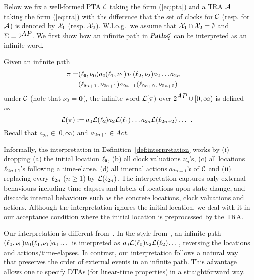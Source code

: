 Below we fix a well-formed PTA $\mathcal{C}$ taking the form (\ref{eq:pta}) and a TRA $\mathcal{A}$ taking the form (\ref{eq:tra}) with the difference that the set of clocks for $\mathcal{C}$ (resp. for $\mathcal{A}$) is denoted by $\mathcal{X}_1$ (resp. $\mathcal{X}_2$).
W.l.o.g., we assume that $\mathcal{X}_1\cap\mathcal{X}_2=\emptyset$ and $\Sigma=2^{\mbox{\sl AP}}$.
We first show how an infinite path in $\mbox{\sl Paths}^\omega_{\mathcal{C}}$ can be interpreted as an infinite word.
% 
\begin{definition}\label{def:interpretation}
Given an infinite path
\begin{align*}
    \pi
        =
        & 
            (\ell_0,\nu_0)
            a_0
            (\ell_1,\nu_1)
            a_1
            (\ell_2,\nu_2)a_2
            \dots 
            a_{2n} \\
        &
            (\ell_{2n+1},\nu_{2n+1})
            a_{2n+1}
            (\ell_{2n+2},\nu_{2n+2})
            \dots
\end{align*}
under $\mathcal{C}$ (note that $\nu_0=\mathbf{0}$), the infinite word $\mathcal{L}(\pi)$ over $2^{\mbox{\sl AP}}\cup[0,\infty)$ is defined as 
\[
\mathcal{L}(\pi):=a_0\mathcal{L}(\ell_2)a_2\mathcal{L}(\ell_4)\dots a_{2n}\mathcal{L}(\ell_{2n+2}) \dots\enskip.
\]
Recall that $a_{2n}\in [0,\infty)$ and $a_{2n+1}\in\mbox{\sl Act}$. 
\end{definition}
%
\begin{remark}
Informally, the interpretation in Definition~\ref{def:interpretation} works
by (i) dropping (a) the initial location $\ell_0$, (b) all clock valuations $\nu_n$'s, 
(c) all locations $\ell_{2n+1}$'s following a time-elapse,
(d) all internal actions $a_{2n+1}$'s of $\mathcal{C}$ and (ii) replacing every $\ell_{2n}$ ($n\ge 1$) by $\mathcal{L}(\ell_{2n})$.
The interpretation captures only external behaviours including time-elapses and labels of locations upon state-change, and discards internal behaviours such as the concrete locations, clock valuations and actions.
Although the interpretation ignores the initial location,
we deal with it in our acceptance condition where the initial location is preprocessed by the TRA.
\end{remark}
%
\begin{remark}
Our interpretation is different from~\cite{DBLP:journals/tse/DonatelliHS09,DBLP:journals/corr/abs-1101-3694,DBLP:conf/hybrid/Fu13}.
In the style from~\cite{DBLP:journals/tse/DonatelliHS09,DBLP:journals/corr/abs-1101-3694,DBLP:conf/hybrid/Fu13}, an infinite path
$(\ell_0,\nu_0)a_0(\ell_1,\nu_1)a_1\dots$ is interpreted as $a_0 \mathcal{L}(\ell_0)a_2 \mathcal{L}(\ell_2)\dots$,
reversing the locations and actions/time-elapses.
In contrast, our interpretation follows a natural way that preserves the order of external events in an infinite path.
This advantage allows one to specify DTAs (for linear-time properties) in a straightforward way.
\end{remark}
